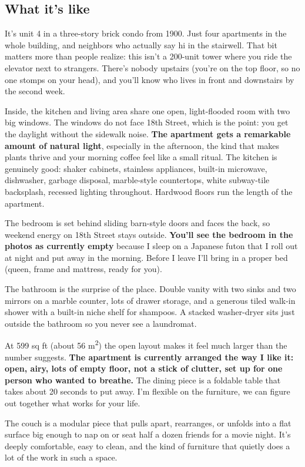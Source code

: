 \documentclass[11pt,a4paper]{article}
\begin{document}
\subsection*{What it's like}

It's unit 4 in a three-story brick condo from 1900. Just four apartments in the whole building, and neighbors who actually say hi in the stairwell. That bit matters more than people realize: this isn't a 200-unit tower where you ride the elevator next to strangers. There's nobody upstairs (you're on the top floor, so no one stomps on your head), and you'll know who lives in front and downstairs by the second week.

Inside, the kitchen and living area share one open, light-flooded room with two big windows. The windows do not face 18th Street, which is the point: you get the daylight without the sidewalk noise. \textbf{The apartment gets a remarkable amount of natural light}, especially in the afternoon, the kind that makes plants thrive and your morning coffee feel like a small ritual. The kitchen is genuinely good: shaker cabinets, stainless appliances, built-in microwave, dishwasher, garbage disposal, marble-style countertops, white subway-tile backsplash, recessed lighting throughout. Hardwood floors run the length of the apartment.

The bedroom is set behind sliding barn-style doors and faces the back, so weekend energy on 18th Street stays outside. \textbf{You'll see the bedroom in the photos as currently empty} because I sleep on a Japanese futon that I roll out at night and put away in the morning. Before I leave I'll bring in a proper bed (queen, frame and mattress, ready for you).

The bathroom is the surprise of the place. Double vanity with two sinks and two mirrors on a marble counter, lots of drawer storage, and a generous tiled walk-in shower with a built-in niche shelf for shampoos. A stacked washer-dryer sits just outside the bathroom so you never see a laundromat.

At 599 sq ft (about 56 m\textsuperscript{2}) the open layout makes it feel much larger than the number suggests. \textbf{The apartment is currently arranged the way I like it: open, airy, lots of empty floor, not a stick of clutter, set up for one person who wanted to breathe.} The dining piece is a foldable table that takes about 20 seconds to put away. I'm flexible on the furniture, we can figure out together what works for your life.

The couch is a modular piece that pulls apart, rearranges, or unfolds into a flat surface big enough to nap on or seat half a dozen friends for a movie night. It's deeply comfortable, easy to clean, and the kind of furniture that quietly does a lot of the work in such a space.
\end{document}
